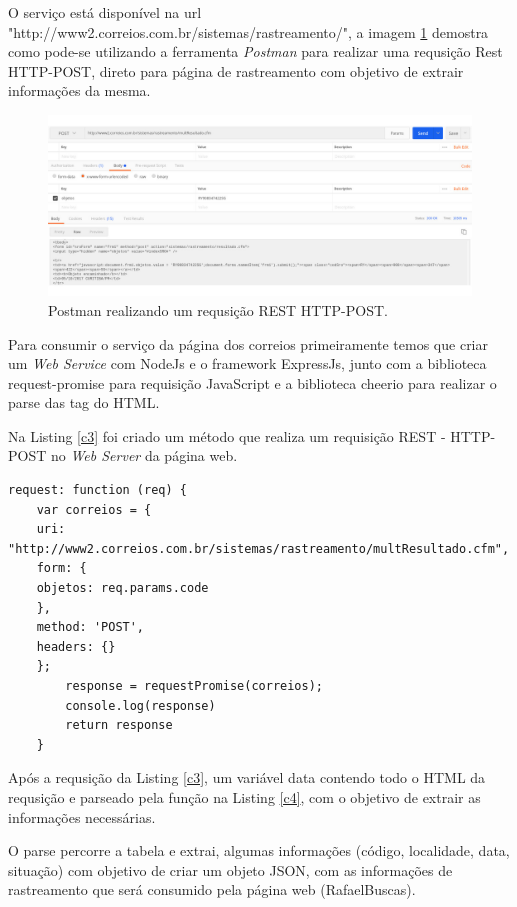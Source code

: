 \documentclass[12pt]{article}
\begin{document}
	O serviço está disponível na url "http://www2.correios.com.br/sistemas/rastreamento/", a imagem \ref{c1} demostra como pode-se utilizando a ferramenta \textit{Postman} para realizar uma requsição Rest HTTP-POST, direto para página de rastreamento com objetivo de extrair informações da mesma.
	
	 \begin{figure}[H]
	 	\centering
	 	\includegraphics[scale=0.3]{Imagens/c1.jpg}
	 	\caption{Postman realizando um requsição REST HTTP-POST.}
	 	\label{c1}
	 \end{figure}
	
	Para consumir o serviço da página dos correios primeiramente temos que criar um \textit{Web Service} com NodeJs e o framework ExpressJs, junto com a biblioteca request-promise para requisição JavaScript e a biblioteca cheerio para realizar o parse das tag do HTML.
	
	Na Listing \ref{c3} foi criado um método que realiza um requisição REST - HTTP-POST no \textit{Web Server} da página web.
	
	\medskip
	\begin{lstlisting}[caption=Criando Requisição em Java Script,label=c3]
	request: function (req) {
	var correios = {
	uri: "http://www2.correios.com.br/sistemas/rastreamento/multResultado.cfm",
	form: {
	objetos: req.params.code
	},
	method: 'POST',
	headers: {}
	};
		response = requestPromise(correios);
		console.log(response)
		return response
	}	
	\end{lstlisting}
	Após a requsição da  Listing \ref{c3}, um variável data contendo todo o HTML da requsição e parseado pela função na Listing \ref{c4}, com o objetivo de extrair as informações necessárias.
	
	O parse percorre a tabela e extrai, algumas informações (código, localidade, data, situação) com objetivo de criar um objeto JSON, com as informações de rastreamento que será consumido pela página web (RafaelBuscas).
	
\end{document}
